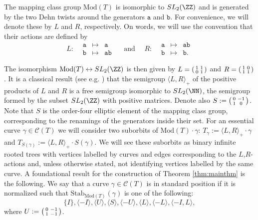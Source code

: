\documentclass{article}
\begin{document}
	The mapping class group $\mathrm{Mod}(T)$ is isomorphic to $SL_2(\ZZ)$ and is generated by the two Dehn twists around the generators $\mathtt{a}$ and $\mathtt{b}$. For convenience, we will denote these by $L$ and $R$, respectively. On words, we will use the convention that their actions are defined by 
	\[
	L:\begin{matrix}
		& \mathtt{a}&\mapsto &\mathtt{a} \\
		& \mathtt{b}& \mapsto & \mathtt{ab}
	\end{matrix}\quad 
	\text{ and }\quad R:
	\begin{matrix}
		& \mathtt{a}&\mapsto &\mathtt{ab} \\
		& \mathtt{b}& \mapsto & \mathtt{b}.
	\end{matrix}
	\]
	
	The isomorphism $\mathrm{Mod}(T)\leftrightarrow SL_2(\ZZ)$ is then given by $L=\begin{psmallmatrix}
		1 & 1 \\ 
		0 & 1
	\end{psmallmatrix}$ and 
	$R=\begin{psmallmatrix}
		1 & 0 \\ 
		1 & 1
	\end{psmallmatrix}$. It is a classical result (see e.g. \cite[Proposition~3.3]{bram18}) that the semigroup $\langle L, R\rangle_+$ of the positive products of $L$ and $R$ is a free semigroup isomorphic to $SL_2(\NN)$, the semigroup formed by the subset $SL_2(\ZZ)$ with positive matrices. Denote also $S:= \begin{psmallmatrix}
		0 & -1 \\
		1 & 0
	\end{psmallmatrix}$. Note that $S$ is the order-four elliptic element of the mapping class group, corresponding to the renamings of the generators inside their set. For an essential curve $\gamma\in \mathcal{C}(T)$ we will consider two suborbits of $\mathrm{Mod}(T)\cdot \gamma$: $T_\gamma:= \langle L, R\rangle_+ \cdot \gamma$ and $T_{S(\gamma)}:= \langle L, R\rangle_+ \cdot S(\gamma)$. We will see these suborbits as binary infinite rooted trees with vertices labelled by curves and edges corresponding to the $L$,$R$-actions and, unless otherwise stated, not identifying vertices labelled by the same curve. A foundational result for the construction of Theorem \ref{thm:mainthm} is the following. We say that a curve $\gamma\in\mathcal{C}(T)$ is in standard position if it is normalized such that $\mathrm{Stab}_{\mathrm{Mod}(T)}(\gamma)$ is one of the following:
    \begin{equation}\label{eq:stand}\{I\}, \langle -I \rangle, \langle U\rangle, \langle S \rangle, \langle -U\rangle, \langle L\rangle, \langle -L\rangle, \langle -I, L\rangle, \end{equation} where $U:=\begin{psmallmatrix}
		0 & -1 \\ 1 & -1
	\end{psmallmatrix}$.
\end{document}
